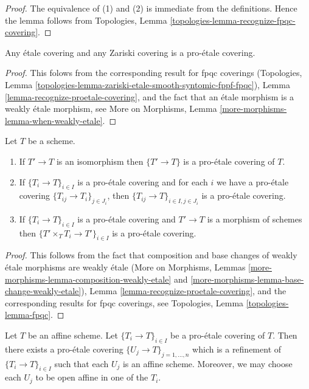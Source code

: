 \begin{proof}
The equivalence of (1) and (2) is immediate from the definitions.
Hence the lemma follows from
Topologies, Lemma \ref{topologies-lemma-recognize-fpqc-covering}.
\end{proof}

\begin{lemma}
\label{lemma-etale-proetale}
Any \'etale covering and any Zariski covering is a pro-\'etale covering.
\end{lemma}

\begin{proof}
This folows from the corresponding result for fpqc coverings
(Topologies, Lemma
\ref{topologies-lemma-zariski-etale-smooth-syntomic-fppf-fpqc}),
Lemma \ref{lemma-recognize-proetale-covering}, and
the fact that an \'etale morphism is a weakly \'etale morphism, see
More on Morphisms, Lemma \ref{more-morphisms-lemma-when-weakly-etale}.
\end{proof}

\begin{lemma}
\label{lemma-proetale}
Let $T$ be a scheme.
\begin{enumerate}
\item If $T' \to T$ is an isomorphism then $\{T' \to T\}$
is a pro-\'etale covering of $T$.
\item If $\{T_i \to T\}_{i\in I}$ is a pro-\'etale covering and for each
$i$ we have a pro-\'etale covering $\{T_{ij} \to T_i\}_{j\in J_i}$, then
$\{T_{ij} \to T\}_{i \in I, j\in J_i}$ is a pro-\'etale covering.
\item If $\{T_i \to T\}_{i\in I}$ is a pro-\'etale covering
and $T' \to T$ is a morphism of schemes then
$\{T' \times_T T_i \to T'\}_{i\in I}$ is a pro-\'etale covering.
\end{enumerate}
\end{lemma}

\begin{proof}
This follows from the fact that composition and base changes
of weakly \'etale morphisms are weakly \'etale
(More on Morphisms, Lemmas
\ref{more-morphisms-lemma-composition-weakly-etale} and
\ref{more-morphisms-lemma-base-change-weakly-etale}),
Lemma \ref{lemma-recognize-proetale-covering}, and
the corresponding results for fpqc coverings, see
Topologies, Lemma \ref{topologies-lemma-fpqc}.
\end{proof}

\begin{lemma}
\label{lemma-proetale-affine}
Let $T$ be an affine scheme. Let $\{T_i \to T\}_{i \in I}$ be a pro-\'etale
covering of $T$. Then there exists a pro-\'etale covering
$\{U_j \to T\}_{j = 1, \ldots, n}$ which is a refinement
of $\{T_i \to T\}_{i \in I}$ such that each $U_j$ is an affine
scheme. Moreover, we may choose each $U_j$ to be open affine
in one of the $T_i$.
\end{lemma}

